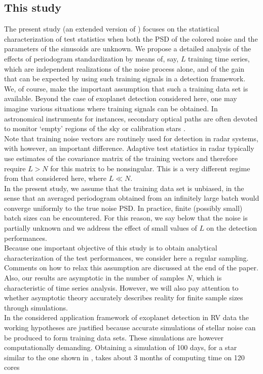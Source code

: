 \documentclass[journal]{IEEEtran}
\begin{document}
\subsection{This study}
The present study  (an extended version of {\cite{Sulis_2016a}}) focuses  on the statistical characterization of test
statistics when both the PSD of the colored  noise and  the parameters of the sinusoids are unknown. We propose a detailed analysis of the effects of periodogram standardization by means   of, say, $L$ training time series{, which are}
 independent realizations of the noise process alone,
and of the gain  that can be expected by using such training signals in a detection framework. \\
We, of course, make the important assumption that such a training data set is  available. Beyond the case of exoplanet detection  considered here,
one may imagine various situations where training signals can be obtained. In astronomical instruments for instances, secondary optical paths are often devoted to monitor `empty'  regions of the sky or calibration stars
{
\cite{Gupta_2001}. \\}
Note that training noise vectors are routinely used for detection in radar systems, with however, an important difference.  
Adaptive test statistics   in radar typically use estimates of the covariance matrix of the training  vectors 
and therefore require $L>N$ for this matrix to be nonsingular. 
This is a very different regime from that considered here, where $L\ll N$.\\
In the present study, we assume that the training data set is unbiased, in the sense that an averaged periodogram obtained from an infinitely large batch would converge uniformly to the true noise PSD. In practice, finite (possibly small) batch sizes can be encountered. For this reason, we say below that the noise is partially unknown and we address the effect of {  small values of $L$} on the detection performances. \\
Because one important objective of this study is to obtain analytical characterization of the test performances, we consider here a regular sampling. Comments on how to relax this assumption are discussed at the end of the paper.
Also,  our results are asymptotic in the number of samples $N$, which is characteristic of time series analysis. However, we will also pay attention to whether asymptotic theory accurately describes reality for finite sample sizes { through simulations}.\\
{ In the considered application framework of exoplanet detection  in RV data the working hypotheses are justified because accurate   simulations of stellar noise can be produced to form training data sets}. These  simulations are however computationally demanding. Obtaining a simulation of 100 days, for a star similar to the one shown  in \cite{Bigot_2011}, takes about 3 months of computing time on 120 cores
\end{document}
